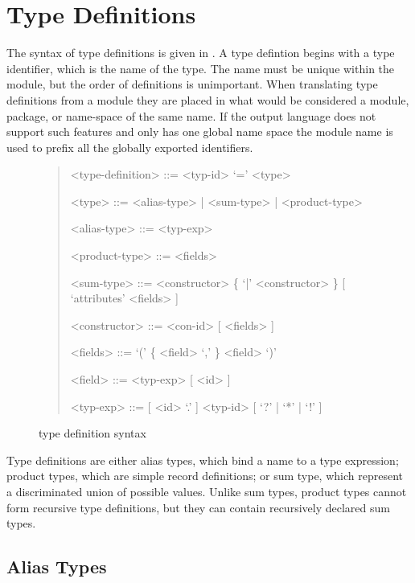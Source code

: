 \section{Type Definitions}

The syntax of type definitions is given in .
A type defintion begins with a type identifier, which is the name of the type.
The name must be unique within the module, but the order of definitions is unimportant.
When translating type definitions from a module they are placed in what would be considered a
module, package, or name-space of the same name.
If the output language does not support such features and only has one global
name space the module name
is used to prefix all the globally exported identifiers.

\begin{figure}[t]
  \begin{quote}
    \begin{grammar}
      <type-definition>  ::=  <typ-id> `=' <type>

      <type>         ::= <alias-type> | <sum-type> | <product-type>

      <alias-type>   ::= <typ-exp>

      <product-type> ::= <fields>

      <sum-type>     ::= <constructor> \{ `|' <constructor> \} [ `attributes' <fields> ]

      <constructor>  ::= <con-id> [ <fields> ]

      <fields>       ::= `(' \{ <field>  `,' \} <field> `)'

      <field>        ::=  <typ-exp> [ <id> ]

      <typ-exp>      ::= [ <id> `.' ] <typ-id> [ `?' | `*' | `!' ]
    \end{grammar}
  \end{quote}
  \caption{\asdl{} type definition syntax}
  \label{fig:type-syntax}
\end{figure}%

Type definitions are either alias types, which bind a name to a type expression;
product types, which are simple record definitions;
or sum type, which represent a discriminated union of possible values.
Unlike sum types, product types cannot form recursive type definitions, but they can
contain recursively declared sum types.

\subsection{Alias Types}

